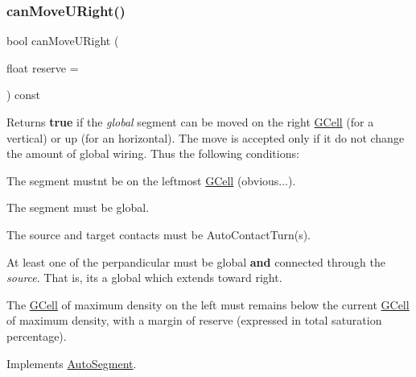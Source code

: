\mbox{\label{classKatabatic_1_1AutoVertical_ad0c972e34d6bac47bd9276a7d6e053d8}} 
\subsubsection{\texorpdfstring{can\+Move\+U\+Right()}{canMoveURight()}}
{\footnotesize\ttfamily bool can\+Move\+U\+Right (\begin{DoxyParamCaption}\item[{float}]{reserve = {} }\end{DoxyParamCaption}) const\hspace{0.3cm}{\ttfamily [virtual]}}

\begin{DoxyReturn}{Returns}
{\bfseries true} if the {\itshape global} segment can be moved on the right \mbox{\hyperlink{classKatabatic_1_1GCell}{G\+Cell}} (for a vertical) or up (for an horizontal). The move is accepted only if it do not change the amount of global wiring. Thus the following conditions\+:
\begin{DoxyItemize}
\item The segment mustn\textquotesingle{}t be on the leftmost \mbox{\hyperlink{classKatabatic_1_1GCell}{G\+Cell}} (obvious...).
\item The segment must be global.
\item The source and target contacts must be Auto\+Contact\+Turn(s).
\item At least one of the perpandicular must be global {\bfseries and} connected through the {\itshape source}. That is, it\textquotesingle{}s a global which extends toward right.
\item The \mbox{\hyperlink{classKatabatic_1_1GCell}{G\+Cell}} of maximum density on the left must remains below the current \mbox{\hyperlink{classKatabatic_1_1GCell}{G\+Cell}} of maximum density, with a margin of {\ttfamily reserve} (expressed in total saturation percentage). 
\end{DoxyItemize}
\end{DoxyReturn}


Implements \mbox{\hyperlink{classKatabatic_1_1AutoSegment_a096deb8a143f098eac2bff9ab9c52243}{Auto\+Segment}}.



